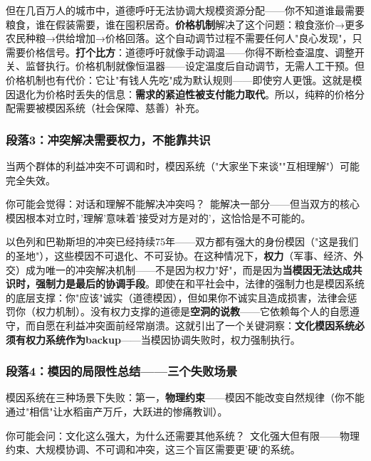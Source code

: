 \documentclass[../main.tex]{subfiles}
\begin{document}
但在几百万人的城市中，道德呼吁无法协调大规模资源分配——你不知道谁最需要粮食，谁在假装需要，谁在囤积居奇。\textbf{价格机制}解决了这个问题：粮食涨价→更多农民种粮→供给增加→价格回落。这个自动调节过程不需要任何人"良心发现"，只需要价格信号。\textbf{打个比方}：道德呼吁就像手动调温——你得不断检查温度、调整开关、监督执行。价格机制就像恒温器——设定温度后自动调节，无需人工干预。但价格机制也有代价：它让"有钱人先吃"成为默认规则——即使穷人更饿。这就是模因退化为价格时丢失的信息：\textbf{需求的紧迫性被支付能力取代}。所以，纯粹的价格分配需要被模因系统（社会保障、慈善）补充。

	\subsubsection*{段落3：冲突解决需要权力，不能靠共识}

	当两个群体的利益冲突不可调和时，模因系统（"大家坐下来谈""互相理解"）可能完全失效。

	\begin{tcolorbox}[colback=yellow!5, title=\textit{读者行为预测}]

		你可能会觉得：对话和理解不能解决冲突吗？\ 能解决一部分——但当双方的核心模因根本对立时，'理解'意味着'接受对方是对的'，这恰恰是不可能的。

	\end{tcolorbox}

以色列和巴勒斯坦的冲突已经持续75年——双方都有强大的身份模因（"这是我们的圣地"），这些模因不可退化、不可妥协。在这种情况下，\textbf{权力}（军事、经济、外交）成为唯一的冲突解决机制——不是因为权力"好"，而是因为\textbf{当模因无法达成共识时，强制力是最后的协调手段}。即使在和平社会中，法律的强制力也是模因系统的底层支撑：你"应该"诚实（道德模因），但如果你不诚实且造成损害，法律会惩罚你（权力机制）。没有权力支撑的道德是\textbf{空洞的说教}——它依赖每个人的自愿遵守，而自愿在利益冲突面前经常崩溃。这就引出了一个关键洞察：\textbf{文化模因系统必须有权力系统作为backup}——当模因协调失败时，权力强制执行。

	\subsubsection*{段落4：模因的局限性总结——三个失败场景}

	模因系统在三种场景下失败：第一，\textbf{物理约束}——模因不能改变自然规律（你不能通过"相信"让水稻亩产万斤，大跃进的惨痛教训）。

	\begin{tcolorbox}[colback=yellow!5, title=\textit{读者行为预测}]

		你可能会问：文化这么强大，为什么还需要其他系统？\ 文化强大但有限——物理约束、大规模协调、不可调和冲突，这三个盲区需要更'硬'的系统。

	\end{tcolorbox}
\end{document}
